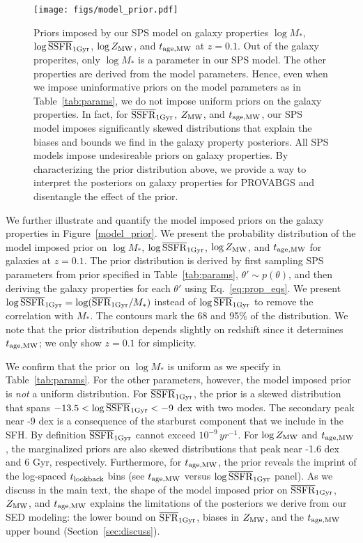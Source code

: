 \begin{figure}
\begin{center}
\texttt{[image: figs/model\_prior.pdf]}
    \caption{
    Priors imposed by our SPS model on galaxy properties $\log M_*$, $\log
    \overline{\rm SSFR}_{\rm 1 Gyr}$, $\log Z_{\rm MW}$, and $t_{\rm age, MW}$ at
    $z=0.1$. 
    Out of the galaxy properites, only $\log M_*$ is a parameter in our SPS
    model.
    The other properties are derived from the model parameters. 
    Hence, even when we impose uninformative priors on the model parameters as
    in Table~\ref{tab:params}, we do not impose uniform priors on the galaxy
    properties. 
    In fact, for $\overline{\rm SSFR}_{\rm 1Gyr}$, $Z_{\rm MW}$, and $t_{\rm age, MW}$, our SPS model imposes
    significantly skewed distributions that explain the biases and bounds we
    find in the galaxy property posteriors.  
    All SPS models impose undesireable priors on galaxy properties. 
    By characterizing the prior distribution above, we provide a way to
    interpret the posteriors on galaxy properties for PROVABGS and disentangle
    the effect of the prior. 
    }\label{fig:model_prior}
\end{center}
\end{figure}
We further illustrate and quantify the model imposed priors on the galaxy
properties in Figure~\ref{model_prior}. 
We present the probability distribution of the model imposed prior on 
$\log M_*$, $\log\overline{\rm SSFR}_{\rm 1Gyr}$, $\log Z_{\rm MW}$, and $t_{\rm age, MW}$ for galaxies at $z=0.1$.
The prior distribution is derived by first sampling SPS parameters from prior
specified in Table~\ref{tab:params}, $\theta'\sim p(\theta)$, and then deriving
the galaxy properties for each $\theta'$ using Eq.~\ref{eq:prop_eqs}. 
We present $\log\overline{\rm SSFR}_{\rm 1Gyr} = \log(\overline{\rm SFR}_{\rm 1Gyr}/M_*)$ instead of $\log\overline{\rm SFR}_{\rm 1Gyr}$ to
remove the correlation with $M_*$.  
The contours mark the 68 and 95\% of the distribution. 
We note that the prior distribution depends slightly on redshift since it
determines $t_{\rm age, MW}$; we only show $z=0.1$ for simplicity. 

We confirm that the prior on $\log M_*$ is uniform as we specify in
Table~\ref{tab:params}. 
For the other parameters, however, the model imposed prior is \emph{not} a uniform distribution. 
For $\overline{\rm SSFR}_{\rm 1Gyr}$, the prior is a skewed distribution that spans $-13.5 < \log
\overline{\rm SSFR}_{\rm 1Gyr} < -9$ dex with two modes.
The secondary peak near -9 dex is a consequence of the starburst component that
we include in the SFH. 
By definition $\overline{\rm SSFR}_{\rm 1Gyr}$ cannot exceed $10^{-9}\,yr^{-1}$. 
For $\log Z_{\rm MW}$ and $t_{\rm age, MW}$, the marginalized priors are also skewed
distributions that peak near -1.6 dex and 6 Gyr, respectively.
Furthermore, for $t_{\rm age, MW}$, the prior reveals the imprint of the log-spaced 
$t_{\rm lookback}$ bins (see $t_{\rm age, MW}$ versus $\log\overline{\rm SSFR}_{\rm 1Gyr}$ panel).
As we discuss in the main text, the shape of the model imposed prior on
$\overline{\rm SSFR}_{\rm 1Gyr}$, $Z_{\rm MW}$, and $t_{\rm age, MW}$ explains the limitations of the posteriors we
derive from our SED modeling: the lower bound on $\overline{\rm SFR}_{\rm 1Gyr}$, biases in $Z_{\rm MW}$,
and the $t_{\rm age, MW}$ upper bound (Section~\ref{sec:discuss}).


